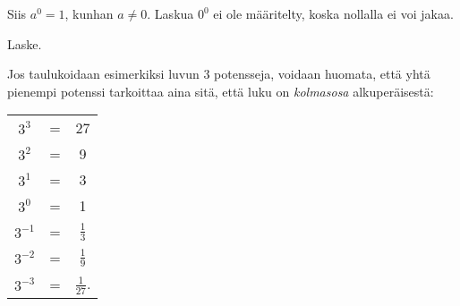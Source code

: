 Siis $a^0=1$, kunhan $a\neq 0$.  Laskua $0^0$ ei ole määritelty, koska
nollalla ei voi jakaa. 
 
  

    \begin{esimerkki}
        Laske.
        \begin{alakohdat}
         \end{alakohdat}
    \end{esimerkki}

Jos taulukoidaan esimerkiksi luvun 3 potensseja, voidaan huomata, että
yhtä pienempi potenssi tarkoittaa aina sitä, että luku on \emph{kolmasosa}
alkuperäisestä:
   
\begin{tabular}{c c c}
$3^3$ & = & 27 \\
$3^2$ & = & 9 \\
$3^1$ & = & 3 \\
$3^0$ & = & 1 \\
$3^{-1}$ & = & $\frac{1}{3}$ \\
$3^{-2}$ & = & $\frac{1}{9}$ \\
$3^{-3}$ & = & $\frac{1}{27}$.
\end{tabular}
